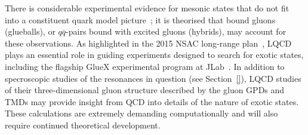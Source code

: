 There is considerable experimental evidence for mesonic states that do not fit into a constituent quark model picture~\cite{Patrignani:2016xqp}; it is theorised that bound gluons (glueballs), or $q\overline{q}$-pairs bound with excited gluons (hybrids), may account for these observations. 
As highlighted in the 2015 NSAC long-range plan~\cite{Geesaman:2015fha}, LQCD plays an essential role in guiding experiments designed to search for exotic states, including the flagship GlueX experimental program at JLab~\cite{Dobbs:2017vjw}. In addition to specroscopic studies of the resonances in question {\color{red}(see Section~\ref{})}, LQCD studies of their three-dimensional gluon structure described by the gluon GPDs and TMDs may provide insight from QCD into details of the nature of exotic states. These calculations are extremely demanding computationally and will also require continued theoretical development.
